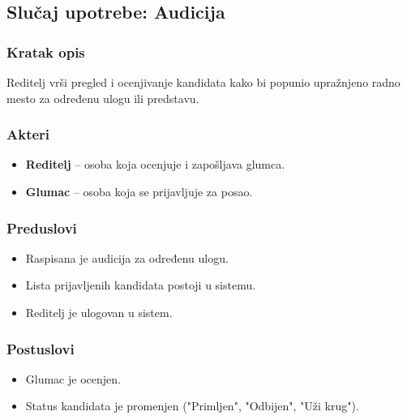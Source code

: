 \subsection{Slučaj upotrebe: Audicija}

\subsubsection*{Kratak opis}
Reditelj vrši pregled i ocenjivanje kandidata kako bi popunio upražnjeno radno mesto za određenu ulogu ili predstavu.
\subsubsection*{Akteri}
\begin{itemize}
    \item \textbf{Reditelj} -- osoba koja ocenjuje i zapošljava glumca.
     \item \textbf{Glumac} -- osoba koja se prijavljuje za posao.
\end{itemize}

\subsubsection*{Preduslovi}
\begin{itemize}
    \item Raspisana je audicija za određenu ulogu.
    \item Lista prijavljenih kandidata postoji u sistemu.
    \item Reditelj je ulogovan u sistem.
     
\end{itemize}

\subsubsection*{Postuslovi}
\begin{itemize}
    \item Glumac je ocenjen.
    \item Status kandidata je promenjen ("Primljen", "Odbijen", "Uži krug").
\end{itemize}

